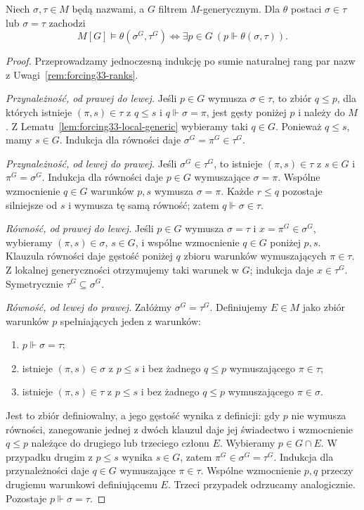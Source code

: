 \begin{twierdzenie}
\label{thm:forcing33-atomic-truth}
Niech $\sigma,\tau\in M$ będą
nazwami, a $G$ filtrem $M$-generycznym.
Dla $\theta$ postaci $\sigma\in\tau$
lub $\sigma=\tau$ zachodzi
\[
M[G]\models\theta(\sigma^G,\tau^G)
\iff\exists p\in G\
(p\Vdash\theta(\sigma,\tau)).
\]
\end{twierdzenie}
\begin{proof}
Przeprowadzamy jednoczesną indukcję
po sumie naturalnej rang par nazw
z Uwagi~\ref{rem:forcing33-ranks}.

\emph{Przynależność, od prawej do lewej.}
Jeśli $p\in G$ wymusza $\sigma\in\tau$,
to zbiór $q\leq p$, dla których istnieje
$(\pi,s)\in\tau$ z
$q\leq s$ i $q\Vdash\sigma=\pi$,
jest gęsty poniżej $p$ i należy do $M$.
Z Lematu~\ref{lem:forcing33-local-generic}
wybieramy taki $q\in G$.
Ponieważ $q\leq s$, mamy $s\in G$.
Indukcja dla równości daje
$\sigma^G=\pi^G\in\tau^G$.

\emph{Przynależność, od lewej do prawej.}
Jeśli $\sigma^G\in\tau^G$, to
istnieje $(\pi,s)\in\tau$
z $s\in G$ i $\pi^G=\sigma^G$.
Indukcja dla równości daje
$p\in G$ wymuszające $\sigma=\pi$.
Wspólne wzmocnienie $q\in G$
warunków $p,s$ wymusza $\sigma=\pi$.
Każde $r\leq q$ pozostaje
silniejsze od $s$ i wymusza
tę samą równość; zatem
$q\Vdash\sigma\in\tau$.

\emph{Równość, od prawej do lewej.}
Jeśli $p\in G$ wymusza
$\sigma=\tau$ i
$x=\pi^G\in\sigma^G$,
wybieramy $(\pi,s)\in\sigma$,
$s\in G$, i wspólne
wzmocnienie $q\in G$ poniżej $p,s$.
Klauzula równości daje gęstość
poniżej $q$ zbioru warunków
wymuszających $\pi\in\tau$.
Z lokalnej generyczności
otrzymujemy taki warunek w $G$;
indukcja daje $x\in\tau^G$.
Symetrycznie $\tau^G\subseteq\sigma^G$.

\emph{Równość, od lewej do prawej.}
Załóżmy $\sigma^G=\tau^G$.
Definiujemy $E\in M$ jako zbiór
warunków $p$ spełniających jeden
z warunków:
\begin{enumerate}
\item $p\Vdash\sigma=\tau$;
\item istnieje $(\pi,s)\in\sigma$
z $p\leq s$ i bez żadnego
$q\leq p$ wymuszającego $\pi\in\tau$;
\item istnieje $(\pi,s)\in\tau$
z $p\leq s$ i bez żadnego
$q\leq p$ wymuszającego $\pi\in\sigma$.
\end{enumerate}
Jest to zbiór definiowalny,
a jego gęstość wynika z definicji:
gdy $p$ nie wymusza równości,
zanegowanie jednej z dwóch klauzul
daje jej świadectwo i wzmocnienie
$q\leq p$ należące do drugiego
lub trzeciego członu $E$.
Wybieramy $p\in G\cap E$.
W przypadku drugim z $p\leq s$
wynika $s\in G$, zatem
$\pi^G\in\sigma^G=\tau^G$.
Indukcja dla przynależności
daje $q\in G$ wymuszające
$\pi\in\tau$. Wspólne wzmocnienie
$p,q$ przeczy drugiemu warunkowi
definiującemu $E$. Trzeci
przypadek odrzucamy analogicznie.
Pozostaje $p\Vdash\sigma=\tau$.
\end{proof}

